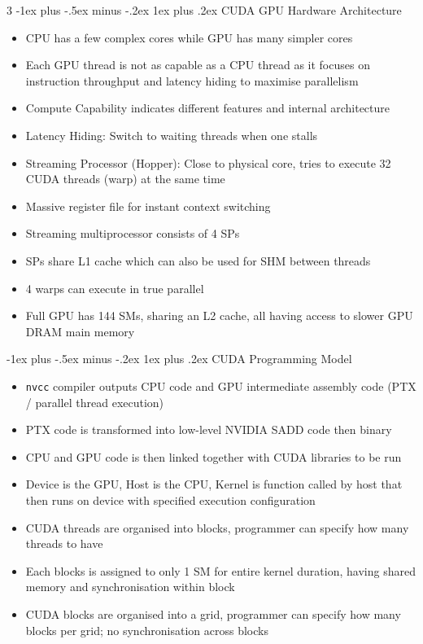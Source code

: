 \documentclass[10pt, landscape]{article}
\makeatletter
\renewcommand{\subsection}{\@startsection{subsection}{3}{0mm}%
                                {-1ex plus -.5ex minus -.2ex}%
                                {1ex plus .2ex}%
                                {\normalfont\small\bfseries}}%
\makeatother
\begin{document}
\begin{multicols*}{3}
\subsection{CUDA GPU Hardware Architecture}
\begin{itemize}
    \item CPU has a few complex cores while GPU has many simpler cores
    \item Each GPU thread is not as capable as a CPU thread as it focuses on instruction throughput and latency hiding to maximise parallelism
    \item Compute Capability indicates different features and internal architecture
    \item Latency Hiding: Switch to waiting threads when one stalls
    \item Streaming Processor (Hopper): Close to physical core, tries to execute 32 CUDA threads (warp) at the same time
    \item Massive register file for instant context switching
    \item Streaming multiprocessor consists of 4 SPs
    \item SPs share L1 cache which can also be used for SHM between threads
    \item 4 warps can execute in true parallel
    \item Full GPU has 144 SMs, sharing an L2 cache, all having access to slower GPU DRAM main memory
\end{itemize}

\subsection{CUDA Programming Model}
\begin{itemize}
    \item \verb|nvcc| compiler outputs CPU code and GPU intermediate assembly code (PTX / parallel thread execution)
    \item PTX code is transformed into low-level NVIDIA SADD code then binary
    \item CPU and GPU code is then linked together with CUDA libraries to be run
    \item Device is the GPU, Host is the CPU, Kernel is function called by host that then runs on device with specified execution configuration
    \item CUDA threads are organised into blocks, programmer can specify how many threads to have
    \item Each blocks is assigned to only 1 SM for entire kernel duration, having shared memory and synchronisation within block
    \item CUDA blocks are organised into a grid, programmer can specify how many blocks per grid; no synchronisation across blocks
\end{itemize}


\end{multicols*}
\end{document}
